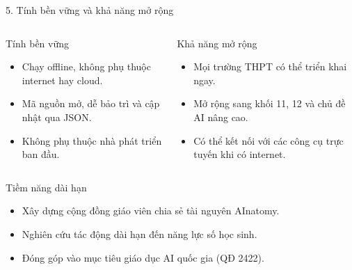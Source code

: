 \documentclass[10pt, aspectratio=169]{beamer}
\begin{document}
\begin{frame}{5. Tính bền vững và khả năng mở rộng}
    \begin{columns}
        \begin{block}{Tính bền vững}
            \begin{itemize}
                \item Chạy offline, không phụ thuộc internet hay cloud.
                \item Mã nguồn mở, dễ bảo trì và cập nhật qua JSON.
                \item Không phụ thuộc nhà phát triển ban đầu.
            \end{itemize}
        \end{block}
        \begin{block}{Khả năng mở rộng}
            \begin{itemize}
                \item Mọi trường THPT có thể triển khai ngay.
                \item Mở rộng sang khối 11, 12 và chủ đề AI nâng cao.
                \item Có thể kết nối với các công cụ trực tuyến khi có internet.
            \end{itemize}
        \end{block}
    \end{columns}
    
    \vspace{0.5em}
    
    \begin{block}{Tiềm năng dài hạn}
        \begin{itemize}
            \item Xây dựng cộng đồng giáo viên chia sẻ tài nguyên AInatomy.
            \item Nghiên cứu tác động dài hạn đến năng lực số học sinh.
            \item Đóng góp vào mục tiêu giáo dục AI quốc gia (QĐ 2422).
        \end{itemize}
    \end{block}
\end{frame}
\end{document}
